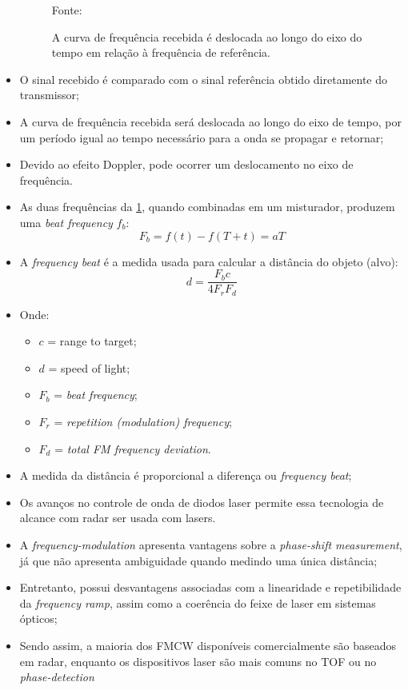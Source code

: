 \documentclass[xcolor=dvipsnames, aspectratio=169]{beamer}
\begin{document}
\begin{frame}
\begin{itemize}
\begin{figure}
            {Fonte: \cite{everett1995sensors}}
            \caption{A curva de frequência recebida é deslocada ao longo do eixo do tempo em relação à frequência de referência.}
            \label{fig:curva_de_freq}
        \end{figure}
        \item O sinal recebido é comparado com o sinal referência obtido diretamente do transmissor;
        \item A curva de frequência recebida será deslocada ao longo do eixo de tempo, por um período igual ao tempo necessário para a onda se propagar e retornar;
        \item Devido ao efeito Doppler, pode ocorrer um deslocamento no eixo de frequência.
        \item As duas frequências da \ref{fig:curva_de_freq}, quando combinadas em um misturador, produzem uma \textit{beat frequency} $f_{b}$:
        \begin{equation}
            F_{b} = f(t) - f(T + t) = aT
        \end{equation}
        \item A \textit{frequency beat} é a medida usada para calcular a distância do objeto (alvo):
        \begin{equation}
            d = \frac{F_{b}c}{4F_{r}F{_d}}
        \end{equation}
        \item Onde:
        \begin{itemize}
            \item[] $c$ = range to target;
            \item[] $d$ = speed of light;
            \item[] $F_{b}$ = \textit{beat frequency};
            \item[] $F_{r}$ = \textit{repetition (modulation) frequency};
            \item[] $F_{d}$ = \textit{total FM frequency deviation}.
        \end{itemize}
        \item A medida da distância é proporcional a diferença ou \textit{frequency beat};
        \item Os avanços no controle de onda de diodos laser permite essa tecnologia de alcance com radar ser usada com lasers.
        \item A \textit{frequency-modulation} apresenta vantagens sobre a \textit{phase-shift measurement}, já que não apresenta ambiguidade quando medindo uma única distância;
        \item Entretanto, possui desvantagens associadas com a linearidade e repetibilidade da \textit{frequency ramp}, assim como a coerência do feixe de laser em sistemas ópticos;
        \item Sendo assim, a maioria dos FMCW disponíveis comercialmente são baseados em radar, enquanto os dispositivos laser são mais comuns no TOF ou no \textit{phase-detection}
	\end{itemize}
\end{frame}
\end{document}
